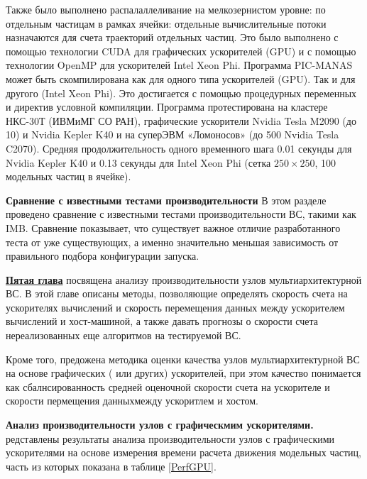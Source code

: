 Также было выполнено распалаллеливание на мелкозернистом уровне: по отдельным частицам в рамках ячейки: отдельные вычислительные потоки назначаются для счета траекторий отдельных частиц. Это было выполнено с помощью технологии CUDA для графических ускорителей (GPU) и с помощью технологии OpenMP для ускорителей Intel Xeon Phi. Программа PIC-MANAS может быть скомпилирована как для одного типа ускорителей (GPU). Так и для другого (Intel Xeon Phi). Это достигается с помощью процедурных переменных и директив условной компиляции. Программа протестирована на кластере НКС-30Т (ИВМиМГ СО РАН), графические ускорители Nvidia Tesla M2090 (до 10) и Nvidia Kepler K40 и на суперЭВМ «Ломоносов»  (до 500 Nvidia Tesla C2070). Средняя продолжительность одного временного шага 0.01 секунды для  Nvidia Kepler K40 и 0.13 секунды для  Intel Xeon Phi (сетка $250\times250$, 100 модельных частиц в ячейке).



\textbf{Сравнение с известными тестами производительности}
В этом разделе проведено сравнение с известными тестами производительности ВС, такими как IMB. Сравнение показывает, что существует важное отличие разработанного теста от уже существующих, а именно значительно меньшая зависимость от правильного подбора конфигурации запуска.  

\underline{\textbf{Пятая глава}} посвящена 
анализу производительности узлов мультиархитектурной ВС.
В этой главе описаны методы, позволяющие определять скорость счета на ускорителях вычислений и скорость перемещения данных между ускорителем вычислений и хост-машиной, а также давать прогнозы о скорости счета нереализованных еще алгоритмов на тестируемой ВС.

Кроме того, предожена методика оценки качества узлов мультиархитектурной ВС на основе графических ( или других) ускорителей, при этом качество понимается как сбалнсированность средней оценочной скорости счета на ускорителе и скорости пермещения данныхмежду ускоритлем и хостом. 

\textbf{Анализ производительности узлов с графическмим ускорителями.}
редставлены результаты анализа производительности узлов с графическими ускорителями на основе измерения времени расчета движения модельных частиц, часть из которых показана в таблице \ref{PerfGPU}.

